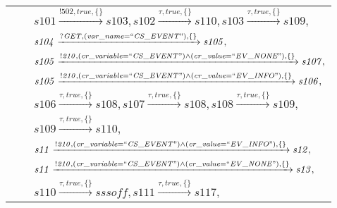 \begin{tabular}{lcl}
& & $\mathit{s101}\xrightarrow{\mathit{!502}, \mathit{true}, \{\}}\mathit{s103},\mathit{s102}\xrightarrow{\mathit{\tau}, \mathit{true}, \{\}}\mathit{s110},\mathit{s103}\xrightarrow{\mathit{\tau}, \mathit{true}, \{\}}\mathit{s109},$ \\
& & $\mathit{s104}\xrightarrow{\mathit{?GET}, \mathit{(var\_name = ``CS\_EVENT")}, \{\}}\mathit{s105},$ \\
& & $\mathit{s105}\xrightarrow{\mathit{!210}, \mathit{(cr\_variable = ``CS\_EVENT") \land (cr\_value = ``EV\_NONE")}, \{\}}\mathit{s107},$ \\
& & $\mathit{s105}\xrightarrow{\mathit{!210}, \mathit{(cr\_variable = ``CS\_EVENT") \land (cr\_value = ``EV\_INFO")}, \{\}}\mathit{s106},$ \\
& & $\mathit{s106}\xrightarrow{\mathit{\tau}, \mathit{true}, \{\}}\mathit{s108},\mathit{s107}\xrightarrow{\mathit{\tau}, \mathit{true}, \{\}}\mathit{s108},\mathit{s108}\xrightarrow{\mathit{\tau}, \mathit{true}, \{\}}\mathit{s109},$ \\
& & $\mathit{s109}\xrightarrow{\mathit{\tau}, \mathit{true}, \{\}}\mathit{s110},$ \\
& & $\mathit{s11}\xrightarrow{\mathit{!210}, \mathit{(cr\_variable = ``CS\_EVENT") \land (cr\_value = ``EV\_INFO")}, \{\}}\mathit{s12},$ \\
& & $\mathit{s11}\xrightarrow{\mathit{!210}, \mathit{(cr\_variable = ``CS\_EVENT") \land (cr\_value = ``EV\_NONE")}, \{\}}\mathit{s13},$ \\
& & $\mathit{s110}\xrightarrow{\mathit{\tau}, \mathit{true}, \{\}}\mathit{sssoff},\mathit{s111}\xrightarrow{\mathit{\tau}, \mathit{true}, \{\}}\mathit{s117},$ \\
\end{tabular}

